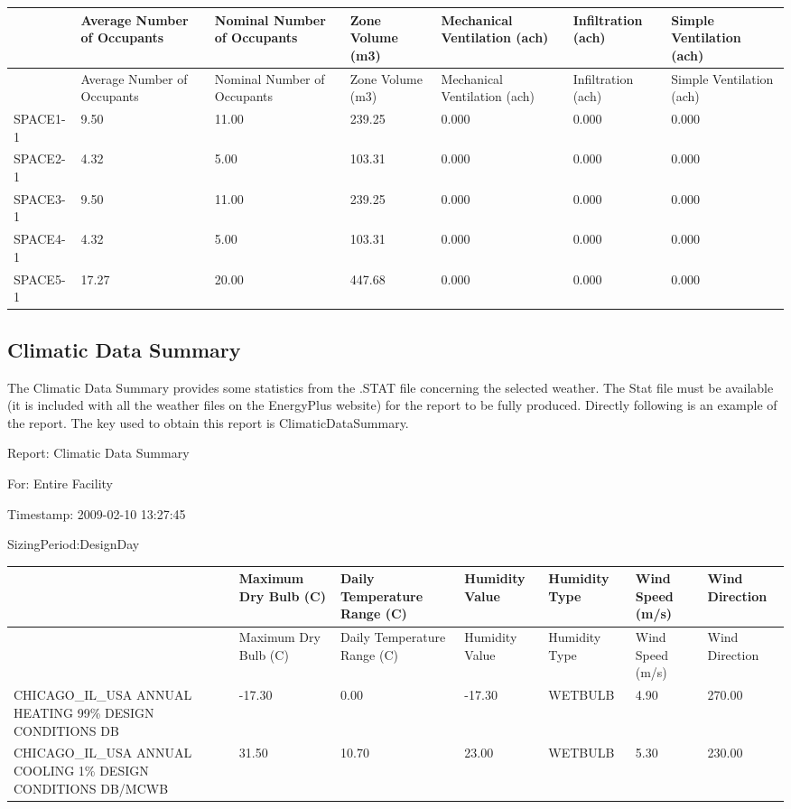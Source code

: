 \begin{longtable}[c]{>{\raggedright}p{0.85in}>{\raggedright}p{0.85in}>{\raggedright}p{0.85in}>{\raggedright}p{0.85in}>{\raggedright}p{0.85in}>{\raggedright}p{0.85in}>{\raggedright}p{0.85in}}
\toprule 
~ & Average Number of Occupants & Nominal Number of Occupants & Zone Volume (m3) & Mechanical Ventilation (ach) & Infiltration (ach) & Simple Ventilation (ach) \tabularnewline
\midrule
\endfirsthead

\toprule 
~ & Average Number of Occupants & Nominal Number of Occupants & Zone Volume (m3) & Mechanical Ventilation (ach) & Infiltration (ach) & Simple Ventilation (ach) \tabularnewline
\midrule
\endhead

SPACE1-1 & 9.50 & 11.00 & 239.25 & 0.000 & 0.000 & 0.000 \tabularnewline
SPACE2-1 & 4.32 & 5.00 & 103.31 & 0.000 & 0.000 & 0.000 \tabularnewline
SPACE3-1 & 9.50 & 11.00 & 239.25 & 0.000 & 0.000 & 0.000 \tabularnewline
SPACE4-1 & 4.32 & 5.00 & 103.31 & 0.000 & 0.000 & 0.000 \tabularnewline
SPACE5-1 & 17.27 & 20.00 & 447.68 & 0.000 & 0.000 & 0.000 \tabularnewline
\bottomrule
\end{longtable}

\subsection{Climatic Data Summary}\label{climatic-data-summary}

The Climatic Data Summary provides some statistics from the .STAT file concerning the selected weather. The Stat file must be available (it is included with all the weather files on the EnergyPlus website) for the report to be fully produced. Directly following is an example of the report. The key used to obtain this report is ClimaticDataSummary.

Report: Climatic Data Summary

For: Entire Facility

Timestamp: 2009-02-10 13:27:45

SizingPeriod:DesignDay

\begin{longtable}[c]{>{\raggedright}p{0.85in}>{\raggedright}p{0.85in}>{\raggedright}p{0.85in}>{\raggedright}p{0.85in}>{\raggedright}p{0.85in}>{\raggedright}p{0.85in}>{\raggedright}p{0.85in}}
\toprule 
~ & Maximum Dry Bulb (C) & Daily Temperature Range (C) & Humidity Value & Humidity Type & Wind Speed (m/s) & Wind Direction \tabularnewline
\midrule
\endfirsthead

\toprule 
~ & Maximum Dry Bulb (C) & Daily Temperature Range (C) & Humidity Value & Humidity Type & Wind Speed (m/s) & Wind Direction \tabularnewline
\midrule
\endhead

CHICAGO\-\_IL\-\_USA ANNUAL HEATING 99\% DESIGN CONDITIONS DB & -17.30 & 0.00 & -17.30 & WETBULB & 4.90 & 270.00 \tabularnewline
CHICAGO\-\_IL\-\_USA ANNUAL COOLING 1\% DESIGN CONDITIONS DB/MCWB & 31.50 & 10.70 & 23.00 & WETBULB & 5.30 & 230.00 \tabularnewline
\bottomrule
\end{longtable}

